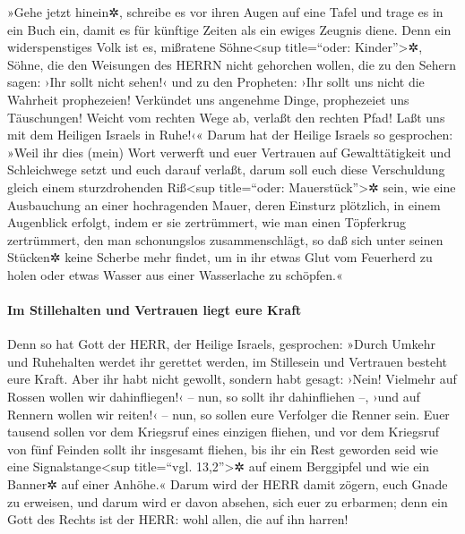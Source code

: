 »Gehe jetzt hinein✲, schreibe es vor ihren Augen auf eine
Tafel und trage es in ein Buch ein, damit es für künftige Zeiten als ein
ewiges Zeugnis diene. Denn ein widerspenstiges Volk ist
es, mißratene Söhne\textless sup title=``oder: Kinder''\textgreater✲,
Söhne, die den Weisungen des HERRN nicht gehorchen wollen,
die zu den Sehern sagen: ›Ihr sollt nicht sehen!‹ und zu
den Propheten: ›Ihr sollt uns nicht die Wahrheit prophezeien! Verkündet
uns angenehme Dinge, prophezeiet uns Täuschungen! Weicht
vom rechten Wege ab, verlaßt den rechten Pfad! Laßt uns mit dem Heiligen
Israels in Ruhe!‹« Darum hat der Heilige Israels so
gesprochen: »Weil ihr dies (mein) Wort verwerft und euer Vertrauen auf
Gewalttätigkeit und Schleichwege setzt und euch darauf verlaßt,
darum soll euch diese Verschuldung gleich einem
sturzdrohenden Riß\textless sup title=``oder: Mauerstück''\textgreater✲
sein, wie eine Ausbauchung an einer hochragenden Mauer, deren Einsturz
plötzlich, in einem Augenblick erfolgt, indem er sie
zertrümmert, wie man einen Töpferkrug zertrümmert, den man schonungslos
zusammenschlägt, so daß sich unter seinen Stücken✲ keine Scherbe mehr
findet, um in ihr etwas Glut vom Feuerherd zu holen oder etwas Wasser
aus einer Wasserlache zu schöpfen.«

\hypertarget{im-stillehalten-und-vertrauen-liegt-eure-kraft}{%
\paragraph{Im Stillehalten und Vertrauen liegt eure
Kraft}\label{im-stillehalten-und-vertrauen-liegt-eure-kraft}}

Denn so hat Gott der HERR, der Heilige Israels,
gesprochen: »Durch Umkehr und Ruhehalten werdet ihr gerettet werden, im
Stillesein und Vertrauen besteht eure Kraft. Aber ihr habt nicht
gewollt, sondern habt gesagt: ›Nein! Vielmehr auf Rossen
wollen wir dahinfliegen!‹ -- nun, so sollt ihr dahinfliehen --, ›und auf
Rennern wollen wir reiten!‹ -- nun, so sollen eure Verfolger die Renner
sein. Euer tausend sollen vor dem Kriegsruf eines
einzigen fliehen, und vor dem Kriegsruf von fünf Feinden sollt ihr
insgesamt fliehen, bis ihr ein Rest geworden seid wie eine
Signalstange\textless sup title=``vgl. 13,2''\textgreater✲ auf einem
Berggipfel und wie ein Banner✲ auf einer Anhöhe.« Darum
wird der HERR damit zögern, euch Gnade zu erweisen, und darum wird er
davon absehen, sich euer zu erbarmen; denn ein Gott des Rechts ist der
HERR: wohl allen, die auf ihn harren!

